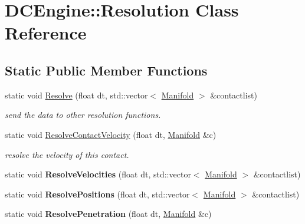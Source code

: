 \hypertarget{classDCEngine_1_1Resolution}{\section{D\-C\-Engine\-:\-:Resolution Class Reference}
\label{classDCEngine_1_1Resolution}
}
\subsection*{Static Public Member Functions}
\begin{DoxyCompactItemize}
\item 
static void \hyperlink{classDCEngine_1_1Resolution_a10bb03544c36f48117ffa750681908cc}{Resolve} (float dt, std\-::vector$<$ \hyperlink{classDCEngine_1_1Manifold}{Manifold} $>$ \&contactlist)
\begin{DoxyCompactList}\small\item\em send the data to other resolution functions. \end{DoxyCompactList}\item 
static void \hyperlink{classDCEngine_1_1Resolution_aa9c4825154a9a8d0ebc1ede07172a9ad}{Resolve\-Contact\-Velocity} (float dt, \hyperlink{classDCEngine_1_1Manifold}{Manifold} \&c)
\begin{DoxyCompactList}\small\item\em resolve the velocity of this contact. \end{DoxyCompactList}\item 
\hypertarget{classDCEngine_1_1Resolution_a10e6a42071ad8e4263451040c4a68488}{static void {\bfseries Resolve\-Velocities} (float dt, std\-::vector$<$ \hyperlink{classDCEngine_1_1Manifold}{Manifold} $>$ \&contactlist)}\label{classDCEngine_1_1Resolution_a10e6a42071ad8e4263451040c4a68488}

\item 
\hypertarget{classDCEngine_1_1Resolution_ab7740b36274653c45ec4304be62bc9b3}{static void {\bfseries Resolve\-Positions} (float dt, std\-::vector$<$ \hyperlink{classDCEngine_1_1Manifold}{Manifold} $>$ \&contactlist)}\label{classDCEngine_1_1Resolution_ab7740b36274653c45ec4304be62bc9b3}

\item 
\hypertarget{classDCEngine_1_1Resolution_a55f884029c97176deb0393948065d657}{static void {\bfseries Resolve\-Penetration} (float dt, \hyperlink{classDCEngine_1_1Manifold}{Manifold} \&c)}\label{classDCEngine_1_1Resolution_a55f884029c97176deb0393948065d657}

\end{DoxyCompactItemize}


